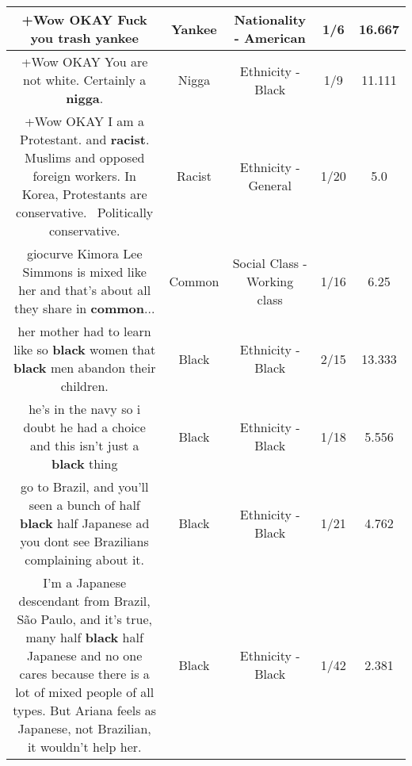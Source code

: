 \documentclass[11pt]{article}
\newlength\mylength
\begin{document}
\begin{center}
\begin{longtable}{|C{.65\mylength}|C{.30\mylength}|C{.12\mylength}|C{.12\mylength}|C{.12\mylength}|}
  \small +Wow OKAY Fuck you trash yankee\normalsize   & Yankee & Nationality - American & 1/6 & 16.667 \\  \hline
  \small +Wow OKAY You are not white. Certainly a \textbf{nigga}.\normalsize   & Nigga & Ethnicity - Black & 1/9 & 11.111 \\  \hline
  \small +Wow OKAY I am a Protestant. and \textbf{racist}. Muslims and opposed foreign workers. In Korea, Protestants are conservative.  Politically conservative.\normalsize   & Racist & Ethnicity - General & 1/20 & 5.0 \\  \hline
  \small giocurve Kimora Lee Simmons is mixed like her and that's about all they share in \textbf{common}...\normalsize   & Common & Social Class - Working class & 1/16 & 6.25 \\  \hline
  \small her mother had to learn like so \textbf{black} women  that \textbf{black} men abandon their children.\normalsize   & Black & Ethnicity - Black & 2/15 & 13.333 \\  \hline
  \small he's in the navy so i doubt he had a choice and this isn't just a \textbf{black} thing\normalsize   & Black & Ethnicity - Black & 1/18 & 5.556 \\  \hline
  \small go to Brazil, and you'll seen a bunch of half \textbf{black} half Japanese ad you dont see Brazilians complaining about it.\normalsize   & Black & Ethnicity - Black & 1/21 & 4.762 \\  \hline
  \small I'm a Japanese descendant from Brazil, São Paulo, and it's true, many half \textbf{black} half Japanese and no one cares because there is a lot of mixed people of all types. But Ariana feels as Japanese, not Brazilian, it wouldn't help her.\normalsize   & Black & Ethnicity - Black & 1/42 & 2.381 \\  \hline

\end{longtable}
\end{center}
\end{document}
